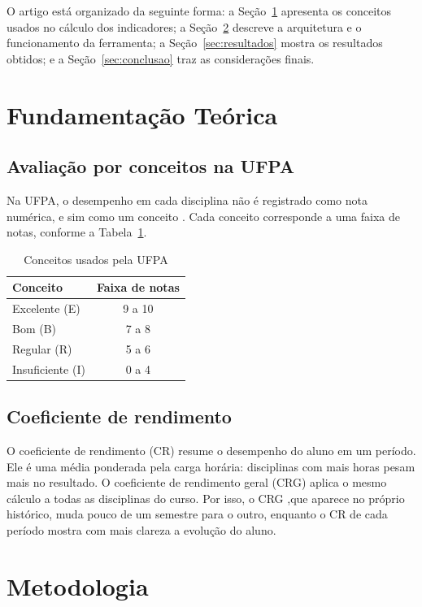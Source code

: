 \documentclass[12pt]{article}
\begin{document}
\begin{abstractp}
O artigo está organizado da seguinte forma: a Seção~\ref{sec:fundamentacao} apresenta os conceitos usados no cálculo dos indicadores; a Seção~\ref{sec:metodologia} descreve a arquitetura e o funcionamento da ferramenta; a Seção~\ref{sec:resultados} mostra os resultados obtidos; e a Seção~\ref{sec:conclusao} traz as considerações finais.

\section{Fundamentação Teórica} \label{sec:fundamentacao}

\subsection{Avaliação por conceitos na UFPA}

Na UFPA, o desempenho em cada disciplina não é registrado como nota numérica, e sim como um conceito \cite{regulamento}. Cada conceito corresponde a uma faixa de notas, conforme a Tabela~\ref{tab:conceitos}.

\begin{table}[htbp]
\centering
\caption{Conceitos usados pela UFPA}
\label{tab:conceitos}
\begin{tabular}{|l|c|}
\hline
\textbf{Conceito} & \textbf{Faixa de notas} \\ \hline
Excelente (E) & 9 a 10 \\ \hline
Bom (B) & 7 a 8 \\ \hline
Regular (R) & 5 a 6 \\ \hline
Insuficiente (I) & 0 a 4 \\ \hline
\end{tabular}
\end{table}

\subsection{Coeficiente de rendimento}

O coeficiente de rendimento (CR) resume o desempenho do aluno em um período. Ele é uma média ponderada pela carga horária: disciplinas com mais horas pesam mais no resultado. O coeficiente de rendimento geral (CRG) aplica o mesmo cálculo a todas as disciplinas do curso. Por isso, o CRG ,que aparece no próprio histórico, muda pouco de um semestre para o outro, enquanto o CR de cada período mostra com mais clareza a evolução do aluno.

\section{Metodologia} \label{sec:metodologia}


\end{abstractp}
\end{document}

